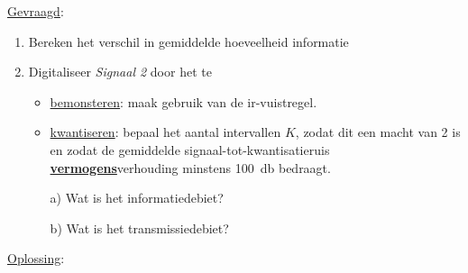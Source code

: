 \documentclass[kulak]{kulakarticle}
\begin{document}
	\underline{Gevraagd}:
	\begin{enumerate}
		\item Bereken het verschil in gemiddelde hoeveelheid informatie
		\item Digitaliseer \textit{Signaal 2} door het te
		\begin{itemize}
			\item \underline{bemonsteren}: maak gebruik van de ir-vuistregel.
			\item \underline{kwantiseren}: bepaal het aantal intervallen \( K \), zodat dit een macht van 2 is en zodat de gemiddelde signaal-tot-kwantisatieruis \underline{\textbf{vermogens}}verhouding minstens \SI{100}{\decibel} bedraagt.
		\end{itemize}
		\begin{enumerate}
			\item[a)] Wat is het informatiedebiet?
			\item[b)] Wat is het transmissiedebiet?
		\end{enumerate}
	\end{enumerate}

	\underline{Oplossing}:
\end{document}

